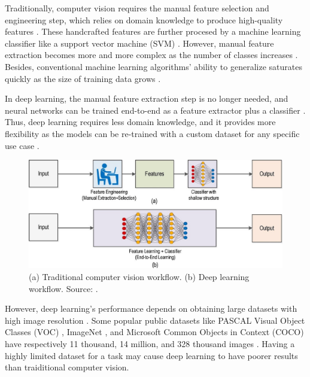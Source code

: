 \documentclass[a4paper, 11pt, oneside]{article}
\begin{document}
  Traditionally, computer vision requires the manual feature selection and engineering step, which relies on domain knowledge
  to produce high-quality features \cite{elgendy2020deep, zhao2019object, o2019deep}. These handcrafted features are further
  procesed by a machine learning classifier like a support vector machine (SVM)
  \cite{elgendy2020deep, zhao2019object, o2019deep}. However, manual feature extraction becomes more and more complex as
  the number of classes increases \cite{o2019deep}. Besides, conventional machine learning algorithms' ability to
  generalize saturates quickly as the size of training data grows \cite{qin2015underwater}.

  In deep learning, the manual feature extraction step is no longer needed, and neural networks can be trained end-to-end
  as a feature extractor plus a classifier \cite{elgendy2020deep, o2019deep}. Thus, deep learning requires less domain
  knowledge, and it provides more flexibility as the models can be re-trained with a custom dataset for any specific use
  case \cite{o2019deep}.

  \begin{figure}[ht]
    \begin{center}
      \includegraphics[width=.7\textwidth]{deep_learning_vs_traditional_computer_vision.png}
    \end{center}
    \caption{(a) Traditional computer vision workflow. (b) Deep learning workflow. Source: \cite{o2019deep}.}
  \end{figure}

  However, deep learning's performance depends on obtaining large datasets with high image resolution \cite{o2019deep}.
  Some popular public datasets like PASCAL Visual Object Classes (VOC) \cite{everingham2010pascal}, ImageNet
  \cite{russakovsky2015imagenet}, and Microsoft Common Objects in Context (COCO) \cite{lin2014microsoft}
  have respectively 11 thousand, 14 million, and 328 thousand images \cite{liu2020deep}. Having a highly limited dataset
  for a task may cause deep learning to have poorer results than traiditional computer vision.
\end{document}
